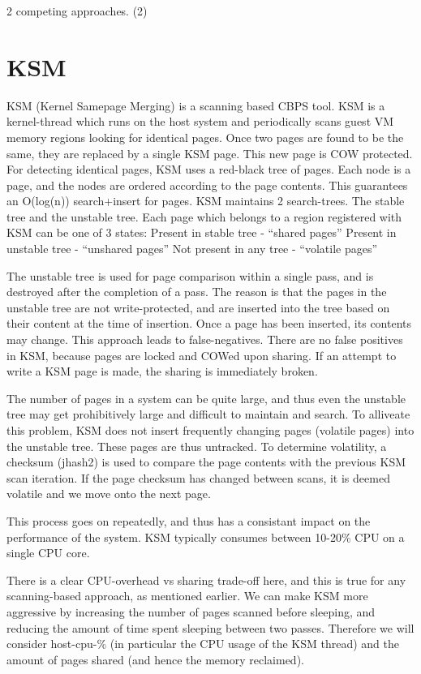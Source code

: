 \documentclass[11pt]{article}
\begin{document}
2 competing approaches.
   (2)
\section{KSM}
\label{sec-4}

KSM (Kernel Samepage Merging) is a scanning based CBPS tool. KSM is a kernel-thread which runs on the host system and periodically scans guest VM memory regions looking for identical pages.
Once two pages are found to be the same, they are replaced by a single KSM page. This new page is COW protected.
For detecting identical pages, KSM uses a red-black tree of pages. Each node is a page, and the nodes are ordered according to the page contents. This guarantees an O(log(n)) search+insert for pages.
KSM maintains 2 search-trees. The stable tree and the unstable tree. Each page which belongs to a region registered with KSM can be one of 3 states:
Present in stable tree - ``shared pages''
Present in unstable tree - ``unshared pages'' 
Not present in any tree - ``volatile pages''

The unstable tree is used for page comparison within a single pass, and is destroyed after the completion of a pass. The reason is that the pages in the unstable tree are not write-protected, and are inserted into the tree based on their content at the time of insertion. Once a page has been inserted, its contents may change. This approach leads to false-negatives. There are no false positives in KSM, because pages are locked and COWed upon sharing. If an attempt to write a KSM page is made, the sharing is immediately broken.

The number of pages in a system can be quite large, and thus even the unstable tree may get prohibitively large and difficult to maintain and search. To alliveate this problem, KSM does not insert frequently changing pages (volatile pages) into the unstable tree. These pages are thus untracked.
To determine volatility, a checksum (jhash2) is used to compare the page contents with the previous KSM scan iteration. If the page checksum has changed between scans, it is deemed volatile and we move onto the next page.

This process goes on repeatedly, and thus has a consistant impact on the performance of the system. KSM typically consumes between 10-20\% CPU on a single CPU core. 

There is a clear CPU-overhead vs sharing trade-off here, and this is true for any scanning-based approach, as mentioned earlier. We can make KSM more aggressive by increasing the number of pages scanned before sleeping, and reducing the amount of time spent sleeping between two passes. 
Therefore we will consider host-cpu-\% (in particular the CPU usage of the KSM thread) and the amount of pages shared (and hence the memory reclaimed).
\end{document}
